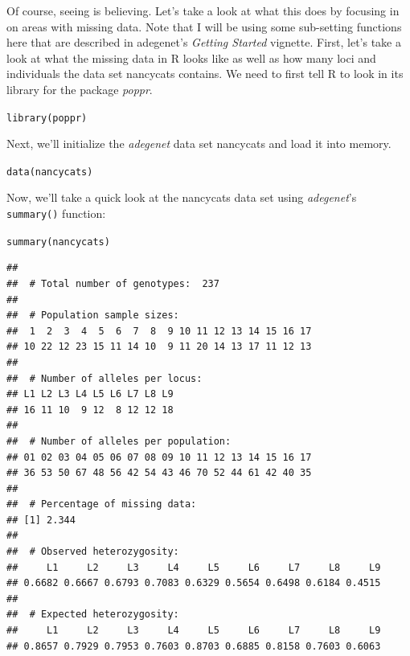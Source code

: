\documentclass[letterpaper]{article}\usepackage[]{graphicx}\usepackage[]{color}
\makeatletter
\newcommand{\hlstd}[1]{\textcolor[rgb]{0,0,0}{#1}}%
\newcommand{\hlkwd}[1]{\textcolor[rgb]{0,0.267,0.4}{#1}}%
\newenvironment{kframe}{%
 \def\at@end@of@kframe{}%
 \ifinner\ifhmode%
  \def\at@end@of@kframe{\end{minipage}}%
  \begin{minipage}{\columnwidth}%
 \fi\fi%
 \def\FrameCommand##1{\hskip\@totalleftmargin \hskip-\fboxsep
 \colorbox{shadecolor}{##1}\hskip-\fboxsep
     \hskip-\linewidth \hskip-\@totalleftmargin \hskip\columnwidth}%
 \MakeFramed {\advance\hsize-\width
   \@totalleftmargin\z@ \linewidth\hsize
   \@setminipage}}%
 {\par\unskip\endMakeFramed%
 \at@end@of@kframe}
\newenvironment{knitrout}{}{} %
\makeatother
\begin{document}
Of course, seeing is believing. Let's take a look at what this does by focusing in on areas with missing data. Note that I will be using some sub-setting functions here that are described in adegenet's \textit{Getting Started} vignette. First, let's take a look at what the missing data in R looks like as well as how many loci and individuals the data set nancycats contains. We need to first tell R to look in its library for the package \textit{poppr}.
\begin{knitrout}\footnotesize
{}\color{fgcolor}\begin{kframe}
\begin{alltt}
\hlkwd{library}\hlstd{(poppr)}
\end{alltt}
\end{kframe}
\end{knitrout}

Next, we'll initialize the \textit{adegenet} data set nancycats and load it into memory.
\begin{knitrout}\footnotesize
{}\color{fgcolor}\begin{kframe}
\begin{alltt}
\hlkwd{data}\hlstd{(nancycats)}
\end{alltt}
\end{kframe}
\end{knitrout}

Now, we'll take a quick look at the nancycats data set using \textit{adegenet}'s \texttt{summary()}  function:
\begin{knitrout}\footnotesize
{}\color{fgcolor}\begin{kframe}
\begin{alltt}
\hlkwd{summary}\hlstd{(nancycats)}
\end{alltt}
\begin{verbatim}
## 
##  # Total number of genotypes:  237 
## 
##  # Population sample sizes:  
##  1  2  3  4  5  6  7  8  9 10 11 12 13 14 15 16 17 
## 10 22 12 23 15 11 14 10  9 11 20 14 13 17 11 12 13 
## 
##  # Number of alleles per locus:  
## L1 L2 L3 L4 L5 L6 L7 L8 L9 
## 16 11 10  9 12  8 12 12 18 
## 
##  # Number of alleles per population:  
## 01 02 03 04 05 06 07 08 09 10 11 12 13 14 15 16 17 
## 36 53 50 67 48 56 42 54 43 46 70 52 44 61 42 40 35 
## 
##  # Percentage of missing data:  
## [1] 2.344
## 
##  # Observed heterozygosity:  
##     L1     L2     L3     L4     L5     L6     L7     L8     L9 
## 0.6682 0.6667 0.6793 0.7083 0.6329 0.5654 0.6498 0.6184 0.4515 
## 
##  # Expected heterozygosity:  
##     L1     L2     L3     L4     L5     L6     L7     L8     L9 
## 0.8657 0.7929 0.7953 0.7603 0.8703 0.6885 0.8158 0.7603 0.6063
\end{verbatim}
\end{kframe}
\end{knitrout}
\end{document}
